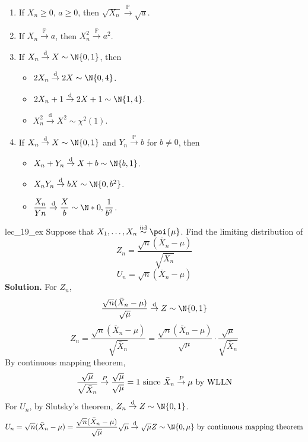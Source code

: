 \begin{Example}{}{}
    \begin{enumerate}[label=(\roman*)]
        \item If $ X_n\ge 0 $, $ a\ge 0 $, then $ \sqrt{X_n}\stackrel{\mathbb{P}}{\to}\sqrt{a} $.
        \item If $ X_n \stackrel{\mathbb{P}}{\to} a $, then
              $ X_n^2\stackrel{\mathbb{P}}{\to}a^2 $.
        \item If $ X_n\stackrel{\text{d}}{\to}X \sim \N{0,1} $, then
              \begin{itemize}
                  \item $ 2X_n\stackrel{\text{d}}{\to}2X\sim\N{0,4} $.
                  \item $ 2X_n+1\stackrel{\text{d}}{\to}2X+1\sim\N{1,4} $.
                  \item $ X_n^2\stackrel{\text{d}}{\to} X^2 \sim \chi^2(1) $.
              \end{itemize}
        \item If $ X_n\stackrel{\text{d}}{\to}X \sim \N{0,1} $
              and $ Y_n\stackrel{\mathbb{P}}{\to}b $ for $ b\neq 0 $, then
              \begin{itemize}
                  \item $ X_n+Y_n\stackrel{\text{d}}{\to}X+b \sim \N{b,1} $.
                  \item $ X_n Y_n \stackrel{\text{d}}{\to}bX \sim \N{0,b^2} $.
                  \item $ \displaystyle \frac{X_n}{Yn} \stackrel{\text{d}}{\to}
                            \frac{X}{b}\sim \N*{0,\frac{1}{b^2}} $.
              \end{itemize}
    \end{enumerate}
\end{Example}
\begin{Example}{}{lec_19_ex}
    Suppose that $ X_1,\ldots,X_n\stackrel{\text{iid}}{\sim}\poi{\mu} $.
    Find the limiting distribution of
    \[ Z_n=\frac{\sqrt{n}(\bar{X}_n-\mu)}{\sqrt{\bar{X}_n}}  \]
    \[ U_n=\sqrt{n}(\bar{X}_n-\mu) \]
    \textbf{Solution.} For $ Z_n $,
    \[ \frac{\sqrt{n}(\bar{X}_n-\mu)}{\sqrt{\mu}}\stackrel{\text{d}}{\to}Z
        \sim \N{0,1}  \]
    \[ Z_n=\frac{\sqrt{n}(\bar{X}_n-\mu)}{\sqrt{\bar{X}_n}}=
        \frac{\sqrt{n}(\bar{X}_n-\mu)}{\sqrt{\mu}}\cdot\frac{\sqrt{\mu}}{\sqrt{\bar{X}_n}}    \]
    By continuous mapping theorem,
    \[ \frac{\sqrt{\mu}}{\sqrt{\bar{X}_n}}\stackrel{\mathbb{P}}{\to}\frac{\sqrt{\mu}}{\sqrt{\mu}}=1
        \text{ since $ \bar{X}_n\stackrel{\mathbb{P}}{\to}\mu $ by WLLN} \]
    For $ U_n $, by Slutsky's theorem, $ Z_n\stackrel{\text{d}}{\to}Z \sim \N{0,1} $.
    \[ U_n=\sqrt{n}(\bar{X}_n-\mu)=\frac{\sqrt{n}(\bar{X}_n-\mu)}{\sqrt{\mu}}\sqrt{\mu}
        \stackrel{\text{d}}{\to}\sqrt{\mu}Z \sim \N{0,\mu}\text{ by
            continuous mapping theorem}  \]
\end{Example}
